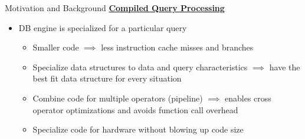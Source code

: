 \begin{block}{Motivation and Background}
    \underline{\textbf{Compiled Query Processing}}
    \begin{itemize}
    \item DB engine is specialized for a particular query
      \begin{itemize}
      \item Smaller code $\implies$ less instruction cache misses and branches
      \item Specialize data structures to data and query characteristics $\implies$ have the best fit data structure for every situation
      \item Combine code for multiple operators (pipeline) $\implies$ enables cross operator optimizations and avoids function call overhead
      \item Specialize code for hardware without blowing up code size
      \end{itemize}
    \end{itemize}
\end{block}


